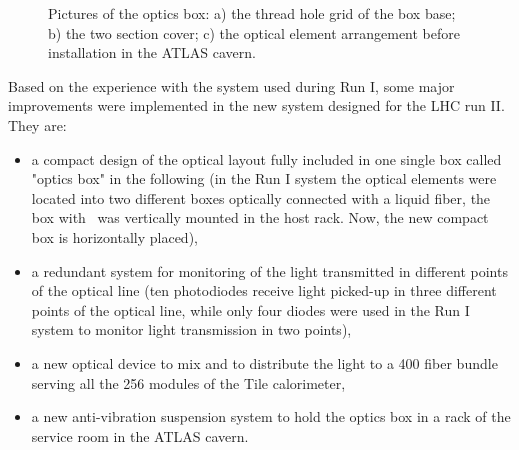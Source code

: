 \begin{figure}[htbp]
\begin{center}
\caption{Pictures of the optics box: a) the thread hole grid of the box base; b) the
two section cover; c) the optical element arrangement before installation in the
ATLAS cavern.  
}\label{fig:x.0}
\end{center}
\end{figure}
%
Based on the experience with the system used during Run I, some major improvements
were implemented in the new system designed for the LHC run II. They are:
\begin{itemize}
\item a compact design of the optical layout fully included in one single box called
"optics box" in the following (in the Run I system the optical elements were located
into two different boxes optically connected with a liquid fiber, the box with \laser~was vertically mounted in the host rack. Now, the new compact box is horizontally
placed),
\item a redundant system for monitoring of the light transmitted in different points of
the optical line (ten photodiodes receive light picked-up in three
different points of the optical line, while only four diodes were used in the Run I
system to monitor light transmission in two points),
\item a new optical device to mix and to distribute the light to a 400 fiber bundle
serving all the 256 modules of the Tile calorimeter,
\item a new anti-vibration suspension system to hold the optics box in a rack of the
service room in the ATLAS cavern.   
\end{itemize}

